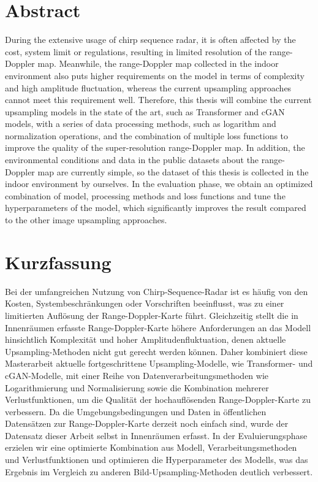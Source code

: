 \begin{minipage}[t]{\textwidth}
    \chapter*{Abstract}
During the extensive usage of chirp sequence radar, it is often affected by the cost, system limit or regulations, resulting in limited resolution of the range-Doppler map. Meanwhile, the range-Doppler map collected in the indoor environment also puts higher requirements on the model in terms of complexity and high amplitude fluctuation, whereas the current upsampling approaches cannot meet this requirement well. Therefore, this thesis will combine the current upsampling models in the state of the art, such as Transformer and cGAN models, with a series of data processing methods, such as logarithm and normalization operations, and the combination of multiple loss functions to improve the quality of the super-resolution range-Doppler map. In addition, the environmental conditions and data in the public datasets about the range-Doppler map are currently simple, so the dataset of this thesis is collected in the indoor environment by ourselves. In the evaluation phase, we obtain an optimized combination of model, processing methods and loss functions and tune the hyperparameters of the model, which significantly improves the result compared to the other image upsampling approaches.
\end{minipage}%
\hfill
\begin{minipage}[t]{\textwidth}
    \chapter*{Kurzfassung}
Bei der umfangreichen Nutzung von Chirp-Sequence-Radar ist es häufig von den Kosten, Systembeschränkungen oder Vorschriften beeinflusst, was zu einer limitierten Auflösung der Range-Doppler-Karte führt. Gleichzeitig stellt die in Innenräumen erfasste Range-Doppler-Karte höhere Anforderungen an das Modell hinsichtlich Komplexität und hoher Amplitudenfluktuation, denen aktuelle Upsampling-Methoden nicht gut gerecht werden können. Daher kombiniert diese Masterarbeit aktuelle fortgeschrittene Upsampling-Modelle, wie Transformer- und cGAN-Modelle, mit einer Reihe von Datenverarbeitungsmethoden wie Logarithmierung und Normalisierung sowie die Kombination mehrerer Verlustfunktionen, um die Qualit\"at der hochauflösenden Range-Doppler-Karte zu verbessern. Da die Umgebungsbedingungen und Daten in öffentlichen Datens\"atzen zur Range-Doppler-Karte derzeit noch einfach sind, wurde der Datensatz dieser Arbeit selbst in Innenräumen erfasst. In der Evaluierungsphase erzielen wir eine optimierte Kombination aus Modell, Verarbeitungsmethoden und Verlustfunktionen und optimieren die Hyperparameter des Modells, was das Ergebnis im Vergleich zu anderen Bild-Upsampling-Methoden deutlich verbessert.
\end{minipage}